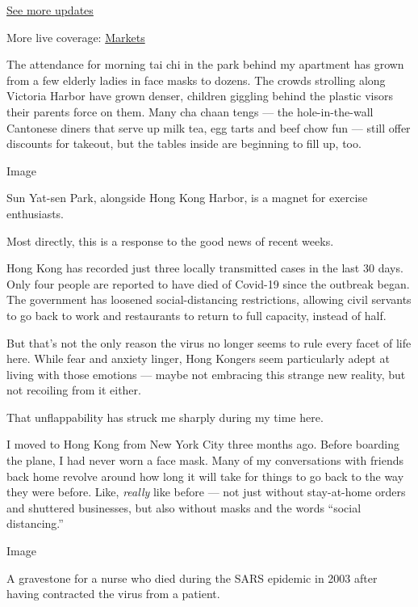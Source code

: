 \href{https://www.nytimes3xbfgragh.onion/2020/08/21/world/covid-19-coronavirus.html?action=click\&pgtype=Article\&state=default\&region=MAIN_CONTENT_1\&context=storylines_live_updates}{See
more updates}

More live coverage:
\href{https://www.nytimes3xbfgragh.onion/live/2020/08/20/business/stock-market-today-coronavirus?action=click\&pgtype=Article\&state=default\&region=MAIN_CONTENT_1\&context=storylines_live_updates}{Markets}

The attendance for morning tai chi in the park behind my apartment has
grown from a few elderly ladies in face masks to dozens. The crowds
strolling along Victoria Harbor have grown denser, children giggling
behind the plastic visors their parents force on them. Many cha chaan
tengs --- the hole-in-the-wall Cantonese diners that serve up milk tea,
egg tarts and beef chow fun --- still offer discounts for takeout, but
the tables inside are beginning to fill up, too.

Image

Sun Yat-sen Park, alongside Hong Kong Harbor, is a magnet for exercise
enthusiasts.

Most directly, this is a response to the good news of recent weeks.

Hong Kong has recorded just three locally transmitted cases in the last
30 days. Only four people are reported to have died of Covid-19 since
the outbreak began. The government has loosened social-distancing
restrictions, allowing civil servants to go back to work and restaurants
to return to full capacity, instead of half.

But that's not the only reason the virus no longer seems to rule every
facet of life here. While fear and anxiety linger, Hong Kongers seem
particularly adept at living with those emotions --- maybe not embracing
this strange new reality, but not recoiling from it either.

That unflappability has struck me sharply during my time here.

I moved to Hong Kong from New York City three months ago. Before
boarding the plane, I had never worn a face mask. Many of my
conversations with friends back home revolve around how long it will
take for things to go back to the way they were before. Like,
\emph{really} like before --- not just without stay-at-home orders and
shuttered businesses, but also without masks and the words ``social
distancing.''

Image

A gravestone for a nurse who died during the SARS epidemic in 2003 after
having contracted the virus from a patient.~

